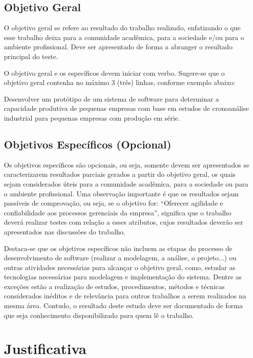 \subsection{Objetivo Geral}\label{subsec:objetivoGeral}

O objetivo geral se refere ao resultado do trabalho realizado, enfatizando o que esse trabalho deixa para a comunidade acadêmica, para a sociedade e/ou para o ambiente profissional. Deve ser apresentado de forma a abranger o resultado principal do teste.

O objetivo geral e os específicos devem iniciar com verbo. Sugere-se que o objetivo geral contenha no máximo 3 (três) linhas, conforme exemplo abaixo:

Desenvolver um protótipo de um sistema de software para determinar a capacidade produtiva de pequenas empresas com base em estudos de cronoanálise industrial para pequenas empresas com produção em série.

\subsection{Objetivos Específicos (Opcional)}\label{subsec:objetivosEspecificos}

Os objetivos específicos são opcionais, ou seja, somente devem ser apresentados se caracterizarem resultados parciais gerados a partir do objetivo geral, os quais sejam considerados úteis para a comunidade acadêmica, para a sociedade ou para o ambiente profissional. Uma observação importante é que os resultados sejam passíveis de comprovação, ou seja, se o objetivo for: “Oferecer agilidade e confiabilidade aos processos gerenciais da empresa”, significa que o trabalho deverá realizar testes com relação a esses atributos, cujos resultados deverão ser apresentados nas discussões do trabalho.

Destaca-se que os objetivos específicos não incluem as etapas do processo de desenvolvimento de software (realizar a modelagem, a análise, o projeto...) ou outras atividades necessárias para alcançar o objetivo geral, como, estudar as tecnologias necessárias para modelagem e implementação do sistema. Dentre as exceções estão a realização de estudos, procedimentos, métodos e técnicas considerados inéditos e de relevância para outros trabalhos a serem realizados na mesma área. Contudo, o resultado deste estudo deve ser documentado de forma que seja conhecimento disponibilizado para quem lê o trabalho.

\section{Justificativa}\label{sec:justificativa}


